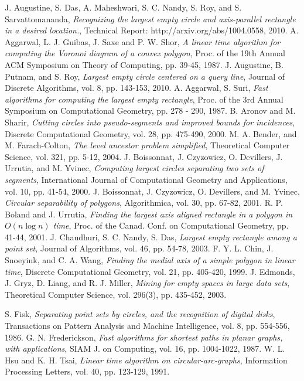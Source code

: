 \documentclass[12pt]{llncs}
\begin{document}
\begin{thebibliography}{88}
 J. Augustine, S. Das, A. Maheshwari, S. C. Nandy,
S. Roy, and S. Sarvattomananda, {\it Recognizing the largest empty circle and
axis-parallel rectangle in a desired location.}, {\sf Technical Report:
http://arxiv.org/abs/1004.0558}, 2010.
 A. Aggarwal, L. J. Guibas, J. Saxe and P. W. Shor, {\it
A linear time algorithm for computing the Voronoi diagram of a convex
polygon}, Proc. of the {\sf 19th Annual ACM Symposium on Theory of
Computing}, pp. 39-45, 1987.
 J. Augustine, B. Putnam, and S. Roy, {\it Largest
empty circle centered on a query line}, {\sf Journal of Discrete
Algorithms}, vol. 8, pp. 143-153, 2010.
 A. Aggarwal, S. Suri, {\it Fast algorithms for computing
the largest empty rectangle}, Proc. of the {\sf 3rd Annual Symposium
on Computational Geometry}, pp. 278 - 290, 1987. 
 B. Aronov and M. Sharir, {\it Cutting circles into
pseudo-segments and improved bounds for incidences}, {\sf Discrete
Computational Geometry}, vol. 28, pp. 475-490, 2000.
 M. A. Bender, and M. Farach-Colton, {\it The level
ancestor problem simplified}, {\sf Theoretical Computer Science},
vol. 321, pp. 5-12, 2004. 
 J. Boissonnat, J. Czyzowicz, O. Devillers,
J. Urrutia, and M. Yvinec, {\it Computing largest circles
separating two sets of segments}, {\sf International Journal of  
Computational Geometry and Applications}, vol. 10, pp. 41-54, 2000.
 J. Boissonnat, J. Czyzowicz, O. Devillers, and
M. Yvinec, {\it Circular separability of polygons}, {\sf Algorithmica},
 vol. 30, pp. 67-82, 2001.
 R. P. Boland and J. Urrutia, {\it Finding the largest
axis aligned rectangle in a polygon in $O(n \log n)$ time}, Proc.
of the {\sf Canad. Conf. on Computational Geometry}, pp. 41-44, 2001.
 J. Chaudhuri, S. C. Nandy, S. Das, {\it Largest empty
rectangle among a point set}, {\sf  Journal of  Algorithms}, vol. 46,
pp. 54-78, 2003.
 F. Y. L. Chin, J. Snoeyink, and C. A. Wang, {\it
Finding the medial axis of a simple polygon in linear time}, {\sf
Discrete Computational Geometry}, vol. 21, pp. 405-420, 1999.
 J. Edmonds, J. Gryz, D. Liang, and R. J. 
Miller, {\it Mining for empty spaces in large data sets}, 
{\sf Theoretical Computer Science}, vol. 296(3), pp. 435-452, 2003. 

 S. Fisk, { \it Separating point sets by circles, and the
recognition of digital disks}, {\sf Transactions on Pattern Analysis and Machine
Intelligence}, vol. 8, pp. 554-556, 1986.
 G. N. Frederickson, {\it Fast algorithms for shortest 
paths in planar graphs, with applications}, {\sf SIAM J. on Computing}, 
vol. 16, pp. 1004-1022, 1987.
 W. L. Hsu and K. H. Tsai, {\it Linear time algorithm
on circular-arc-graphs}, {\sf Information Processing Letters}, vol.
40, pp. 123-129, 1991.



\end{thebibliography}
\end{document}

